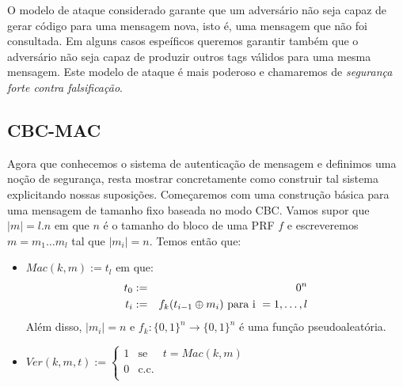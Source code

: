 O modelo de ataque considerado garante que um adversário não seja capaz de gerar código para uma mensagem nova, isto é, uma mensagem que não foi consultada.
Em alguns casos espeíficos queremos garantir também que o adversário não seja capaz de produzir outros tags válidos para uma mesma mensagem.
Este modelo de ataque é mais poderoso e chamaremos de {\em segurança forte contra falsificação}.

\subsection{CBC-MAC}
\label{sec:cbc-mac}

Agora que conhecemos o sistema de autenticação de mensagem e definimos uma noção de segurança, resta mostrar concretamente como construir tal sistema explicitando nossas suposições.
Começaremos com uma construção básica para uma mensagem de tamanho fixo baseada no modo CBC.
Vamos supor que $|m| = l.n$ em que $n$ é o tamanho do bloco de uma PRF $f$ e escreveremos $m = m_1 \dots m_l$ tal que $|m_i| = n$.
Temos então que:


\begin{itemize}
\item $Mac(k, m) := t_l$ em que:
  \begin{eqnarray*}
  t_0 & := & 0^n \\
  t_i & := & f_k(t_{i-1} \oplus m_i) \textrm{ para i } = 1, \dots, l
  \end{eqnarray*}
 Além disso, $|m_i| = n$ e $f_k: \{0,1\}^n \to \{0,1\}^n$ é uma função pseudoaleatória.
\item $Ver(k, m, t) :=  \left\{
    \begin{array}{lcl}
      1 & \textrm{se} & t = Mac(k,m)\\
      0 & \textrm{c.c.} &\\
    \end{array}
    \right.$
  \end{itemize}

\begin{center}
\end{center}


